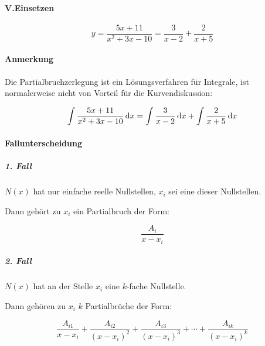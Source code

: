 \paragraph{V.\;Einsetzen}

\[
    y = \frac{5x + 11}{x^2 + 3x - 10} = \frac{3}{x-2} + \frac{2}{x+5}  
\]

\paragraph{Anmerkung}

Die Partialbruchzerlegung ist ein Lösungsverfahren für Integrale, ist normalerweise nicht von Vorteil für
die Kurvendiskussion:

\[
    \int \frac{5x + 11}{x^2 + 3x - 10} \mathop{}\!\mathrm{d} x = \int \frac{3}{x-2} \mathop{}\!\mathrm{d} x + \int \frac{2}{x+5} \mathop{}\!\mathrm{d} x 
\]

\paragraph{Fallunterscheidung}

\subparagraph{1. Fall}

\(N(x)\) hat nur einfache reelle Nullstellen, \(x_i\) sei eine dieser
Nullstellen.

Dann gehört zu \(x_i\) ein Partialbruch der Form:

\[
    \frac{A_i}{x - x_i}    
\]

\subparagraph{2. Fall}

\(N(x)\) hat an der Stelle \(x_i\) eine \(k\)-fache Nullstelle.

Dann gehören zu \(x_i\) \(k\) Partialbrüche der Form:

\[
    \frac{A_{i1}}{x - x_i}  + \frac{A_{i2}}{{(x - x_i)}^2} + \frac{A_{i3}}{{(x - x_i)}^3} + \cdots + \frac{A_{ik}}{{(x - x_i)}^k}   
\]
